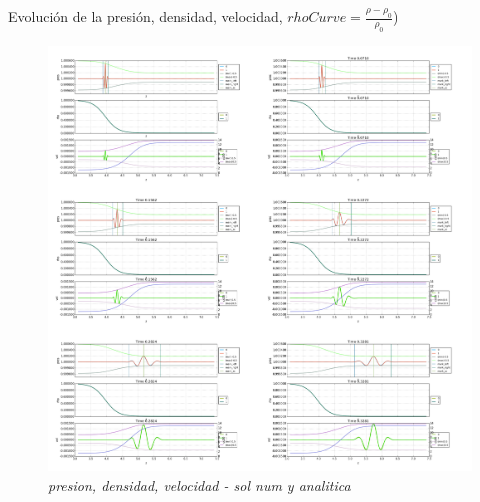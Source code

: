 \documentclass{article}
\begin{document}
\begin{description}

\item Evolución de la presión, densidad, velocidad, $rhoCurve = \frac{\rho- \rho_0}{\rho_0} $)
\item \begin{figure}[!ht]
 \centering
 \includegraphics[scale=0.2]{maininhom1.png}
 \caption{\emph{presion, densidad, velocidad - sol num y analitica}}
\end{figure}

\newpage 


\end{description}
\end{document}
